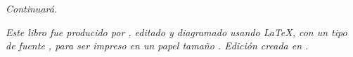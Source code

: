 \cleardoublepage

\null
\vfill

\begin{flushright}
{\normalsize \it Continuará.
\vspace*{4pt}}
\end{flushright}

\newpage

\null
\vfill
\thispagestyle{empty}


{\normalsize \it Este libro fue producido por \myauthor, editado y diagramado usando \LaTeX,
con un tipo de fuente \showfont,
para ser impreso en un papel tamaño \imprimirpapersize. Edición creada en \imprimirdata.
\vspace*{4pt}}






